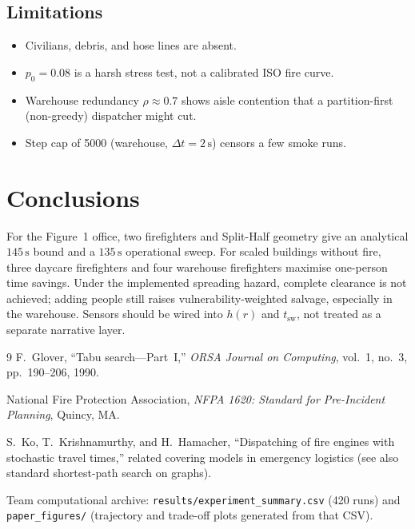 \documentclass[12pt]{article}
\newcommand{\tsw}{t_{\mathrm{sw}}}
\begin{document}
\subsection{Limitations}
\begin{itemize}[leftmargin=1.2em]
  \item Civilians, debris, and hose lines are absent.
  \item \(p_0=0.08\) is a harsh stress test, not a calibrated ISO fire curve.
  \item Warehouse redundancy \(\rho\approx 0.7\) shows aisle contention that a
        partition-first (non-greedy) dispatcher might cut.
  \item Step cap of 5000 (warehouse, \(\Delta t=2\,\mathrm{s}\)) censors a few smoke
        runs.
\end{itemize}

\section{Conclusions}

For the Figure~1 office, two firefighters and Split-Half geometry give an
analytical \(145\,\mathrm{s}\) bound and a \(135\,\mathrm{s}\) operational sweep.
For scaled buildings without fire, three daycare firefighters and four warehouse
firefighters maximise one-person time savings. Under the implemented spreading
hazard, complete clearance is not achieved; adding people still raises
vulnerability-weighted salvage, especially in the warehouse. Sensors should be
wired into \(h(r)\) and \(\tsw\), not treated as a separate narrative layer.

\begin{thebibliography}{9}
F.~Glover, ``Tabu search---Part~I,'' \emph{ORSA Journal on Computing},
vol.~1, no.~3, pp.~190--206, 1990.

National Fire Protection Association, \emph{NFPA 1620: Standard for
Pre-Incident Planning}, Quincy, MA.

S.~Ko, T.~Krishnamurthy, and H.~Hamacher, ``Dispatching of fire engines with
stochastic travel times,'' related covering models in emergency logistics
(see also standard shortest-path search on graphs).

Team computational archive:
\texttt{results/experiment\_summary.csv} (420 runs) and
\texttt{paper\_figures/} (trajectory and trade-off plots generated from that
CSV).
\end{thebibliography}
\end{document}
